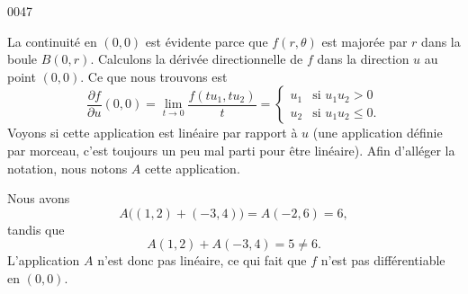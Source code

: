 
\begin{corrige}{0047}

La continuité en $(0,0)$ est évidente parce que $f(r,\theta)$ est majorée par $r$ dans la boule $B(0,r)$. Calculons la dérivée directionnelle de $f$ dans la direction $u$ au point $(0,0)$. Ce que nous trouvons est
\begin{equation}
	\frac{ \partial f }{ \partial u }(0,0)=\lim_{t\to 0}\frac{ f(tu_1,tu_2) }{ t }=
\begin{cases}
	u_1	&	\text{si $u_1u_2>0$}\\
	u_2	&	 \text{si $u_1u_2\leq 0$.}
\end{cases}
\end{equation}
Voyons si cette application est linéaire par rapport à $u$ (une application définie par morceau, c'est toujours un peu mal parti pour être linéaire). Afin d'alléger la notation, nous notons $A$ cette application.

Nous avons
\begin{equation}
	A\big( (1,2)+(-3,4) \big)=A(-2,6)=6,
\end{equation}
tandis que
\begin{equation}
	A(1,2)+A(-3,4)=5\neq 6.
\end{equation}
L'application $A$ n'est donc pas linéaire, ce qui fait que $f$ n'est pas différentiable en $(0,0)$.

\end{corrige}

